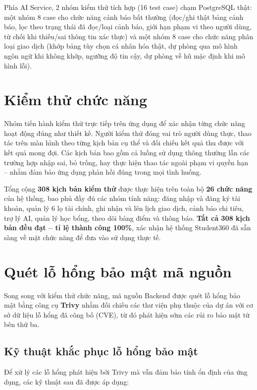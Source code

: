 Phía AI Service, 2 nhóm kiểm thử tích hợp (16 test case) chạm PostgreSQL thật: một nhóm 8 case cho chức năng cảnh báo bất thường (đọc/ghi thật bảng cảnh báo, lọc theo trạng thái đã đọc/loại cảnh báo, giới hạn phạm vi theo người dùng, từ chối khi thiếu/sai thông tin xác thực) và một nhóm 8 case cho chức năng phân loại giao dịch (khớp bảng tùy chọn cá nhân hóa thật, dự phòng qua mô hình ngôn ngữ khi không khớp, ngưỡng độ tin cậy, dự phòng về hũ mặc định khi mô hình lỗi).

\section{Kiểm thử chức năng}
\label{sec:kiem-thu-chuc-nang}

Nhóm tiến hành kiểm thử trực tiếp trên ứng dụng để xác nhận từng chức năng hoạt động đúng như thiết kế. Người kiểm thử đóng vai trò người dùng thực, thao tác trên màn hình theo từng kịch bản cụ thể và đối chiếu kết quả thu được với kết quả mong đợi. Các kịch bản bao gồm cả luồng sử dụng thông thường lẫn các trường hợp nhập sai, bỏ trống, hay thực hiện thao tác ngoài phạm vi quyền hạn -- nhằm đảm bảo ứng dụng phản hồi đúng trong mọi tình huống.

Tổng cộng \textbf{308 kịch bản kiểm thử} được thực hiện trên toàn bộ \textbf{26 chức năng} của hệ thống, bao phủ đầy đủ các nhóm tính năng: đăng nhập và đăng ký tài khoản, quản lý 6 lọ tài chính, ghi nhận và lên lịch giao dịch, cảnh báo chi tiêu, trợ lý AI, quản lý học bổng, theo dõi bảng điểm và thông báo. \textbf{Tất cả 308 kịch bản đều đạt -- tỉ lệ thành công 100\%}, xác nhận hệ thống Student360 đã sẵn sàng về mặt chức năng để đưa vào sử dụng thực tế.

\section{Quét lỗ hổng bảo mật mã nguồn}
\label{sec:kiem-thu-bao-mat}

Song song với kiểm thử chức năng, mã nguồn Backend được quét lỗ hổng bảo mật bằng công cụ \textbf{Trivy} nhằm đối chiếu các thư viện phụ thuộc của dự án với cơ sở dữ liệu lỗ hổng đã công bố (CVE), từ đó phát hiện sớm các rủi ro bảo mật từ bên thứ ba.

\subsection{Kỹ thuật khắc phục lỗ hổng bảo mật}
Để xử lý các lỗ hổng phát hiện bởi Trivy mà vẫn đảm bảo tính ổn định của ứng dụng, các kỹ thuật sau đã được áp dụng:


